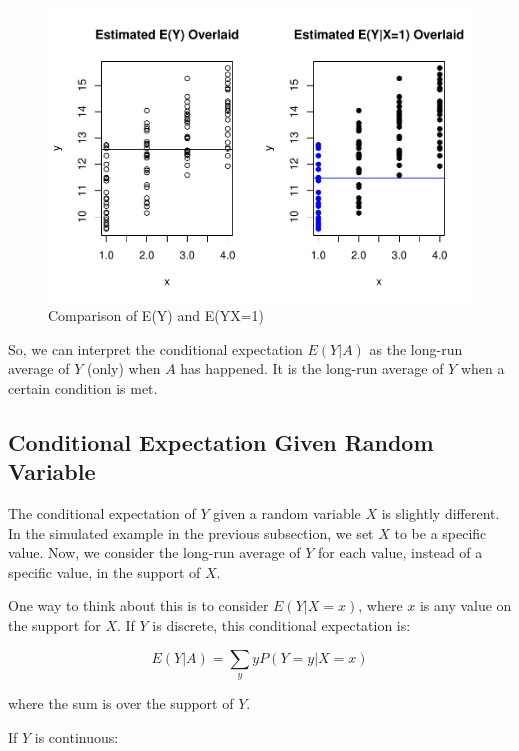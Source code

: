 \documentclass[
]{book}
\begin{document}
\begin{figure}
\centering
\includegraphics{bookdown-demo_files/figure-latex/5-condexp-1.pdf}
\caption{\label{fig:5-condexp}Comparison of E(Y) and E(Y\textbar X=1)}
\end{figure}

So, we can interpret the conditional expectation \(E(Y|A)\) as the long-run average of \(Y\) (only) when \(A\) has happened. It is the long-run average of \(Y\) when a certain condition is met.

\subsection{Conditional Expectation Given Random Variable}\label{conditional-expectation-given-random-variable}

The conditional expectation of \(Y\) given a random variable \(X\) is slightly different. In the simulated example in the previous subsection, we set \(X\) to be a specific value. Now, we consider the long-run average of \(Y\) for each value, instead of a specific value, in the support of \(X\).

One way to think about this is to consider \(E(Y|X=x)\), where \(x\) is any value on the support for \(X\). If \(Y\) is discrete, this conditional expectation is:

\begin{equation} 
E(Y|A) = \sum_y y P(Y=y|X=x) 
\label{eq:5-condexpdis2}
\end{equation}

where the sum is over the support of \(Y\).

If \(Y\) is continuous:
\end{document}
